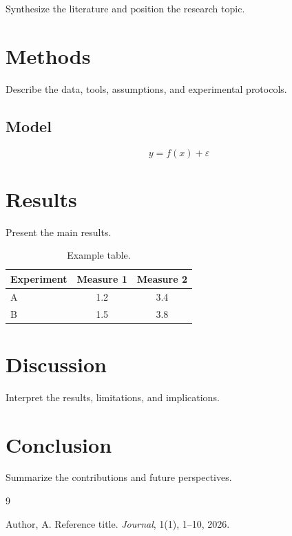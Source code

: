 \documentclass[11pt,a4paper,oneside]{book}
\begin{document}
Synthesize the literature and position the research topic.

\chapter{Methods}

Describe the data, tools, assumptions, and experimental protocols.

\section{Model}

\begin{equation}
  y = f(x) + \varepsilon
\end{equation}

\chapter{Results}

Present the main results.

\begin{table}[h]
  \centering
  \caption{Example table.}
  \begin{tabular}{lcc}
    \toprule
    Experiment & Measure 1 & Measure 2 \\
    \midrule
    A & 1.2 & 3.4 \\
    B & 1.5 & 3.8 \\
    \bottomrule
  \end{tabular}
  \label{tab:example}
\end{table}

\chapter{Discussion}

Interpret the results, limitations, and implications.

\chapter{Conclusion}

Summarize the contributions and future perspectives.

\backmatter

\begin{thebibliography}{9}

Author, A.
\newblock Reference title.
\newblock \emph{Journal}, 1(1), 1--10, 2026.

\end{thebibliography}
\end{document}
